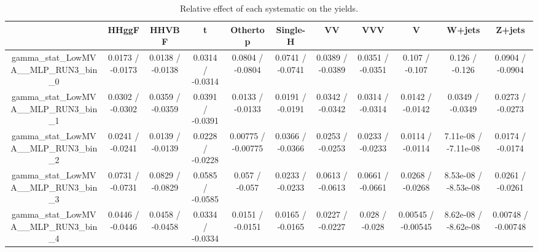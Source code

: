 \documentclass[10pt]{article}
\begin{document}
\begin{table}[htbp]
\begin{center}
\begin{tabular}{|c|c|c|c|c|c|c|c|c|c|c|}
\hline 
      & HHggF      & HHVBF      & t      & Othertop      & Single-H      & VV      & VVV      & V      & W+jets      & Z+jets \\ 
\hline 
  gamma_stat_LowMVA__MLP_RUN3_bin_0 & 0.0173 / -0.0173 & 0.0138 / -0.0138 & 0.0314 / -0.0314 & 0.0804 / -0.0804 & 0.0741 / -0.0741 & 0.0389 / -0.0389 & 0.0351 / -0.0351 & 0.107 / -0.107 & 0.126 / -0.126 & 0.0904 / -0.0904 \\ 
  gamma_stat_LowMVA__MLP_RUN3_bin_1 & 0.0302 / -0.0302 & 0.0359 / -0.0359 & 0.0391 / -0.0391 & 0.0133 / -0.0133 & 0.0191 / -0.0191 & 0.0342 / -0.0342 & 0.0314 / -0.0314 & 0.0142 / -0.0142 & 0.0349 / -0.0349 & 0.0273 / -0.0273 \\ 
  gamma_stat_LowMVA__MLP_RUN3_bin_2 & 0.0241 / -0.0241 & 0.0139 / -0.0139 & 0.0228 / -0.0228 & 0.00775 / -0.00775 & 0.0366 / -0.0366 & 0.0253 / -0.0253 & 0.0233 / -0.0233 & 0.0114 / -0.0114 & 7.11e-08 / -7.11e-08 & 0.0174 / -0.0174 \\ 
  gamma_stat_LowMVA__MLP_RUN3_bin_3 & 0.0731 / -0.0731 & 0.0829 / -0.0829 & 0.0585 / -0.0585 & 0.057 / -0.057 & 0.0233 / -0.0233 & 0.0613 / -0.0613 & 0.0661 / -0.0661 & 0.0268 / -0.0268 & 8.53e-08 / -8.53e-08 & 0.0261 / -0.0261 \\ 
  gamma_stat_LowMVA__MLP_RUN3_bin_4 & 0.0446 / -0.0446 & 0.0458 / -0.0458 & 0.0334 / -0.0334 & 0.0151 / -0.0151 & 0.0165 / -0.0165 & 0.0227 / -0.0227 & 0.028 / -0.028 & 0.00545 / -0.00545 & 8.62e-08 / -8.62e-08 & 0.00748 / -0.00748 \\ 
\hline 
\end{tabular} 
\caption{Relative effect of each systematic on the yields.} 
\end{center} 
\end{table} 
\end{document}
